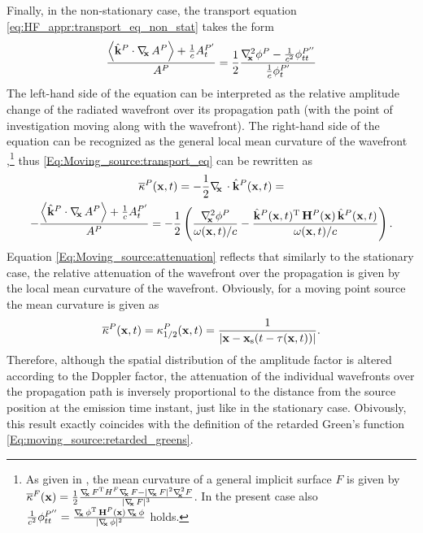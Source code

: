 Finally, in the non-stationary case, the transport equation \eqref{eq:HF_appr:transport_eq_non_stat} takes the form
\begin{equation}
\label{Eq:Moving_source:transport_eq}
\frac{ \left< \hat{\mathbf{k}}^P \cdot \nabla_{\!\!\mathbf{x}}\, A^P \right>+\frac{1}{c} A^{P'}_t }{A^P}  = \frac{1}{2} \frac{ \nabla^2_{\!\!\mathbf{x}} \phi^P - \frac{1}{c^2} \phi^{P''}_{tt} }{\frac{1}{c}\phi^{P'}_t}
\end{equation}
The left-hand side of the equation can be interpreted as the relative amplitude change of the radiated wavefront over its propagation path (with the point of investigation moving along with the wavefront).
The right-hand side of the equation can be recognized as the general local mean curvature of the wavefront \cite[4.2]{Goldman2005},\footnote{As given in \cite{Goldman2005}, the mean curvature of a general implicit surface $F$ is given by 
$\overline{\kappa}^F(\vx) = \frac{1}{2}\frac{\Dx F^{\mathrm{T}} H^F \Dx F - |\Dx F|^2 \Lx F }{|\Dx F|^3}$. In the present case also $\frac{1}{c^2} \phi^{P''}_{tt} = \frac{\nabla_{\!\!\mathbf{x}}\, \phi^{\mathrm{T}} \, \mathbf{H}^P(\mathbf{x}) \, \nabla_{\!\!\mathbf{x}}\, \phi}{|\nabla_{\!\!\mathbf{x}}\, \phi|^2}$ holds.} thus \eqref{Eq:Moving_source:transport_eq} can be rewritten as
\begin{multline}
\overline{\kappa}^P(\mathbf{x},t) = -\frac{1}{2}\nabla_{\!\!\mathbf{x}}\, \cdot \hat{\mathbf{k}}^P(\mathbf{x},t)= \\
-\frac{ \left< \hat{\mathbf{k}}^P \cdot \nabla_{\!\!\mathbf{x}}\, A^P \right>+\frac{1}{c} A^{P'}_t }{A^P} = -\frac{1}{2} \left( \frac{ \nabla^2_{\!\!\mathbf{x}} \phi^P  }{ \omega(\mathbf{x},t)/c } - \frac{ \hat{\mathbf{k}}^P(\mathbf{x},t)^{\mathrm{T}} \, \mathbf{H}^P(\mathbf{x}) \, \hat{\mathbf{k}}^P(\mathbf{x},t) }{ \omega(\mathbf{x},t)/c } \right).
\label{Eq:Moving_source:attenuation}
\end{multline}
Equation \eqref{Eq:Moving_source:attenuation} reflects that similarly to the stationary case, the relative attenuation of the wavefront over the propagation is given by the local mean curvature of the wavefront.
Obviously, for a moving point source the mean curvature is given as
\begin{equation}
\overline{\kappa}^P(\mathbf{x},t) = \kappa^P_{1/2}(\mathbf{x},t) = \frac{1}{|\mathbf{x}-\mathbf{x}_{\mathrm{s}}(t-\tau(\mathbf{x},t))|}.
\label{Eq:Moving_source:attenuation_2}
\end{equation}
Therefore, although the spatial distribution of the amplitude factor is altered according to the Doppler factor, the attenuation of the individual wavefronts over the propagation path is inversely proportional to the distance from the source position at the emission time instant, just like in the stationary case.
Obivously, this result exactly coincides with the definition of the retarded Green's function \eqref{Eq:moving_source:retarded_greens}.

